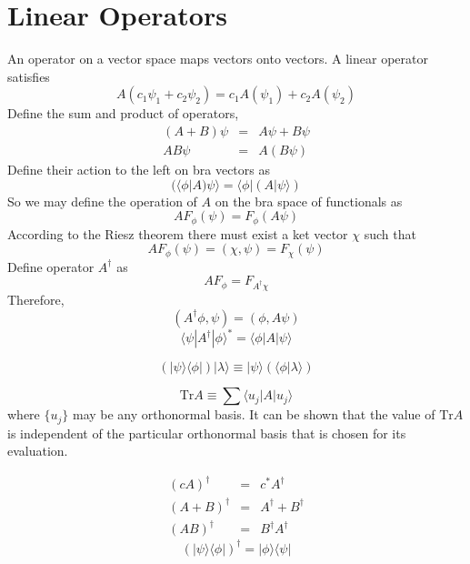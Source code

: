 \documentclass[cyan]{elegantnote}
\begin{document}
\section{Linear Operators}
\begin{newdef}
An operator on a vector space maps vectors onto vectors.
A linear operator satisfies
\[A (c_1 \psi_1 + c_2 \psi_2) = c_1 A(\psi_1) + c_2 A(\psi_2)\]
Define the sum and product of operators,
\begin{eqnarray}
(A+B)\psi &=& A\psi + B\psi \nonumber \\
A B \psi &=& A (B\psi) \nonumber
\end{eqnarray}
Define their action to the left on bra vectors as
\[(\langle \phi | A ) \psi \rangle = \langle \phi | ( A | \psi \rangle )\]
So we may define the operation of $A$ on the bra space of functionals as
\[A F_{\phi} (\psi) = F_{\phi}(A\psi)\]
According to the Riesz theorem there must exist a ket vector $\chi$ such that
\[AF_{\phi}(\psi) = (\chi, \psi) = F_{\chi}(\psi)\]
Define operator $A^{\dagger}$ as
\[AF_{\phi} = F_{A^{\dagger}\chi}\]
Therefore,
\[(A^{\dagger}\phi, \psi) = (\phi, A\psi)\]
\[\langle \psi | A^{\dagger} | \phi \rangle ^* = \langle \phi | A | \psi \rangle\]
\end{newdef}

\begin{newdef}
\[(| \psi \rangle \langle \phi |) | \lambda \rangle \equiv | \psi \rangle (\langle \phi | \lambda \rangle)\]
\end{newdef}

\begin{newdef}[Trace]
\[ \mathrm{Tr} A \equiv \sum \langle u_j | A | u_j \rangle \]
where $\{ u_j \}$ may be any orthonormal basis. It can be shown that the value of $\mathrm{Tr}A$ is independent of the particular orthonormal basis that is chosen for its evaluation.
\end{newdef}

\begin{newprop}
\begin{eqnarray}
(cA)^{\dagger} &=& c^* A^{\dagger} \nonumber \\
(A + B)^{\dagger} &=& A^{\dagger} + B^{\dagger} \nonumber \\
(AB)^{\dagger} &=& B^{\dagger}  A^{\dagger} \nonumber
\end{eqnarray}
\[(| \psi \rangle \langle \phi |) ^ {\dagger} = | \phi \rangle \langle \psi |\]
\end{newprop}
\end{document}
